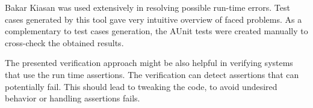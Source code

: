 Bakar Kiasan was used extensively in resolving possible run-time errors. Test cases generated by this tool gave very intuitive overview of faced problems. As a complementary to test cases generation, the AUnit tests were created manually to cross-check the obtained results.

The presented verification approach might be also helpful in verifying systems that use the run time assertions. The verification can detect assertions that can potentially fail. This should lead to tweaking the code, to avoid undesired behavior or handling assertions fails.

